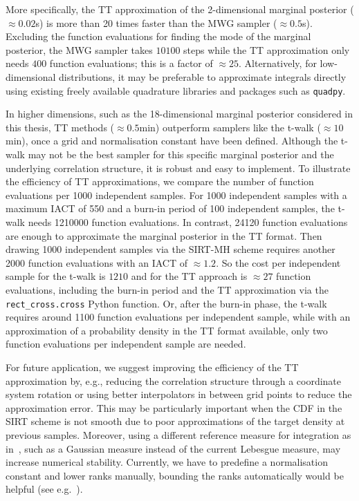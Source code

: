 More specifically, the TT approximation of the 2-dimensional marginal posterior ($\approx0.02$s) is more than 20 times faster than the MWG sampler ($\approx0.5$s).
Excluding the function evaluations for finding the mode of the marginal posterior, the MWG sampler takes $10100$ steps while the TT approximation only needs $400$ function evaluations; this is a factor of $\approx25$.
Alternatively, for low-dimensional distributions, it may be preferable to approximate integrals directly using existing freely available quadrature libraries and packages such as \texttt{quadpy}.

In higher dimensions, such as the 18-dimensional marginal posterior considered in this thesis, TT methods ($\approx0.5$min) outperform samplers like the t-walk ($\approx 10$min), once a grid and normalisation constant have been defined.
Although the t-walk may not be the best sampler for this specific marginal posterior and the underlying correlation structure, it is robust and easy to implement.
To illustrate the efficiency of TT approximations, we compare the number of function evaluations per 1000 independent samples.
For 1000 independent samples with a maximum IACT of 550 and a burn-in period of 100 independent samples, the t-walk needs 1210000 function evaluations. 
In contrast, 24120 function evaluations are enough to approximate the marginal posterior in the TT format.
Then drawing 1000 independent samples via the SIRT-MH scheme requires another 2000 function evaluations with an IACT of $\approx 1.2$.
So the cost per independent sample for the t-walk is $1210$ and for the TT approach is $\approx 27$ function evaluations, including the burn-in period and the TT approximation via the \texttt{rect\_cross.cross} Python function.
Or, after the burn-in phase, the t-walk requires around 1100 function evaluations per independent sample, while with an approximation of a probability density in the TT format available, only two function evaluations per independent sample are needed.

For future application, we suggest improving the efficiency of the TT approximation by, e.g., reducing the correlation structure through a coordinate system rotation or using better interpolators in between grid points to reduce the approximation error.
This may be particularly important when the CDF in the SIRT scheme is not smooth due to poor approximations of the target density at previous samples.  
Moreover, using a different reference measure for integration as in~\cite{cui2022deep}, such as a Gaussian measure instead of the current Lebesgue measure, may increase numerical stability.
Currently, we have to predefine a normalisation constant and lower ranks manually, bounding the ranks automatically would be helpful (see e.g.~\cite{Rohrbach2022tterror}).



